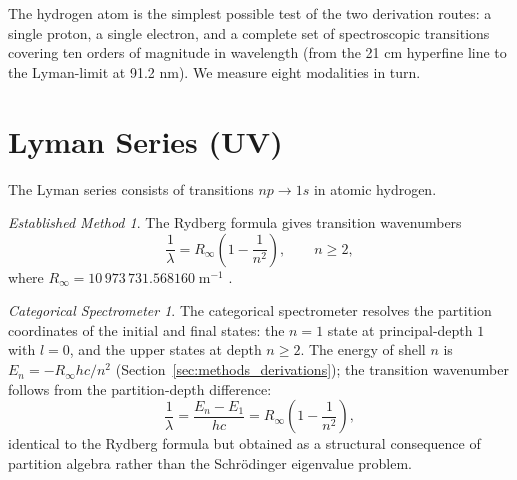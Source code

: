 \documentclass[11pt,a4paper]{article}
\theoremstyle{stmtstyle}
\theoremstyle{definition}
\theoremstyle{remark}
\newtheorem*{spectrometer}{Categorical Spectrometer}
\newtheorem*{established}{Established Method}
\begin{document}
The hydrogen atom is the simplest possible test of the two derivation routes: a single proton, a single electron, and a complete set of spectroscopic transitions covering ten orders of magnitude in wavelength (from the 21 cm hyperfine line to the Lyman-limit at 91.2 nm). We measure eight modalities in turn.

\section{Lyman Series (UV)}
\label{sec:hlyman}

The Lyman series consists of transitions $np \to 1s$ in atomic hydrogen.

\begin{established}
The Rydberg formula gives transition wavenumbers
\begin{equation}
\frac{1}{\lambda} = R_{\infty}\left(1 - \frac{1}{n^{2}}\right), \qquad n \geq 2,
\label{eq:lymanrydberg}
\end{equation}
where $R_{\infty} = 10\,973\,731.568160\;\mathrm{m}^{-1}$ \citep{codata2022}.
\end{established}

\begin{spectrometer}
The categorical spectrometer resolves the partition coordinates of the initial and final states: the $n=1$ state at principal-depth $1$ with $l=0$, and the upper states at depth $n \geq 2$. The energy of shell $n$ is $E_{n} = -R_{\infty} hc / n^{2}$ (Section~\ref{sec:methods_derivations}); the transition wavenumber follows from the partition-depth difference:
\begin{equation}
\frac{1}{\lambda} = \frac{E_{n} - E_{1}}{hc} = R_{\infty}\left(1 - \frac{1}{n^{2}}\right),
\end{equation}
identical to the Rydberg formula but obtained as a structural consequence of partition algebra rather than the Schr\"odinger eigenvalue problem.
\end{spectrometer}
\end{document}
